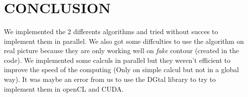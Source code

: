 \section{CONCLUSION}

\paragraph{}
We implemented the 2 differents algorithms and tried without succes to implement them in parallel. We also got some diffculties to use the algorithm on real picture because they are only working well on \textit{fake} contour (created in the code). We implemented some calculs in parallel but they weren't efficient to improve the speed of the computing (Only on simple calcul but not in a global way). It was maybe an error from us to use the DGtal library to try to implement them in openCL and CUDA.